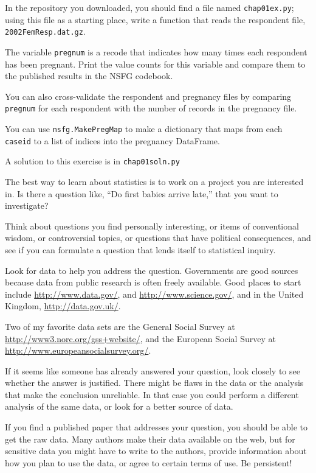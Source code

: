 \documentclass[12pt]{book}
\begin{document}
\begin{exercise}
In the repository you downloaded, you should find a file named
\verb"chap01ex.py"; using this file as a starting place, write a
function that reads the respondent file, {\tt 2002FemResp.dat.gz}.

The variable {\tt pregnum} is a recode that indicates how many
times each respondent has been pregnant.  Print the value counts
for this variable and compare them to the published results in
the NSFG codebook.

You can also cross-validate the respondent and pregnancy files by
comparing {\tt pregnum} for each respondent with the number of
records in the pregnancy file.

You can use {\tt nsfg.MakePregMap} to make a dictionary that maps
from each {\tt caseid} to a list of indices into the pregnancy
DataFrame.

A solution to this exercise is in \verb"chap01soln.py"
\end{exercise}


\begin{exercise}
The best way to learn about statistics is to work on a project you are
interested in.  Is there a question like, ``Do first babies arrive
late,'' that you want to investigate?

Think about questions you find personally interesting, or items of
conventional wisdom, or controversial topics, or questions that have
political consequences, and see if you can formulate a question that
lends itself to statistical inquiry.

Look for data to help you address the question.  Governments are good
sources because data from public research is often freely
available.  Good places to start include \url{http://www.data.gov/},
and \url{http://www.science.gov/}, and in the United Kingdom,
\url{http://data.gov.uk/}.

Two of my favorite data sets are the General Social Survey at
\url{http://www3.norc.org/gss+website/}, and the European Social
Survey at \url{http://www.europeansocialsurvey.org/}.

If it seems like someone has already answered your question, look
closely to see whether the answer is justified.  There might be flaws
in the data or the analysis that make the conclusion unreliable.  In
that case you could perform a different analysis of the same data, or
look for a better source of data.

If you find a published paper that addresses your question, you
should be able to get the raw data.  Many authors make their data
available on the web, but for sensitive data you might have to
write to the authors, provide information about how you plan to use
the data, or agree to certain terms of use.  Be persistent!

\end{exercise}
\end{document}
